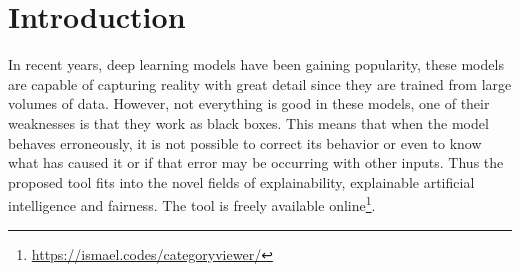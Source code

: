\documentclass[
twocolumn,
]{ceurart}
\begin{document}
\maketitle


\section{Introduction}

In recent years, deep learning models have been gaining popularity, these models are capable of capturing reality with great detail since they are trained from large volumes of data. However, not everything is good in these models, one of their weaknesses is that they work as black boxes. This means that when the model behaves erroneously, it is not possible to correct its behavior or even to know what has caused it or if that error may be occurring with other inputs. Thus the proposed tool fits into the novel fields of explainability, explainable artificial intelligence and fairness. The tool is freely available online\footnote{\url{https://ismael.codes/categoryviewer/}}.
\end{document}
